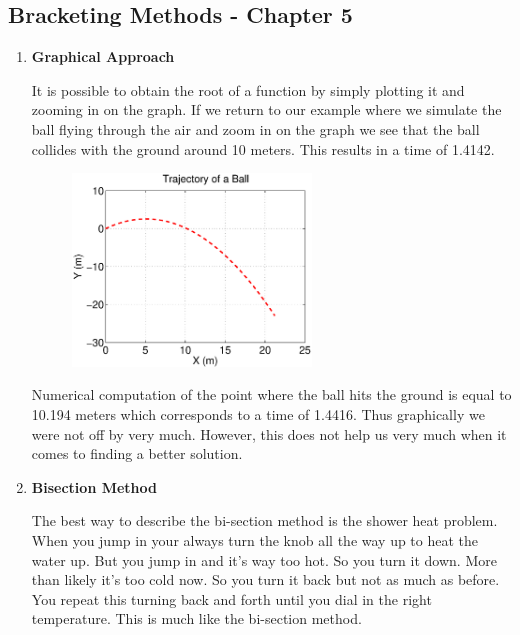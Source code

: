 \subsection{Bracketing Methods - Chapter 5}

\begin{enumerate}

\item {\bf Graphical Approach}

It is possible to obtain the root of a function by simply plotting it
and zooming in on the graph. If we return to our example where we
simulate the ball flying through the air and zoom in on the graph we
see that the ball collides with the ground around 10 meters. This
results in a time of 1.4142.

\begin{figure}[htb]
  \begin{center}
    \includegraphics[height=0.45\textwidth,width=0.6\textwidth]{Graphics/Example_Plot}
  \end{center}
\end{figure}

Numerical computation of the point where the ball hits the ground is
equal to 10.194 meters which corresponds to a time of 1.4416. Thus
graphically we were not off by very much. However, this does not help
us very much when it comes to finding a better solution.

\item{\bf Bisection Method}

The best way to describe the bi-section method is the shower heat
problem. When you jump in your always turn the knob all the way up to
heat the water up. But you jump in and it's way too hot. So you turn
it down. More than likely it's too cold now. So you turn it back but
not as much as before. You repeat this turning back and forth until
you dial in the right temperature. This is much like the bi-section method.


\end{enumerate}
